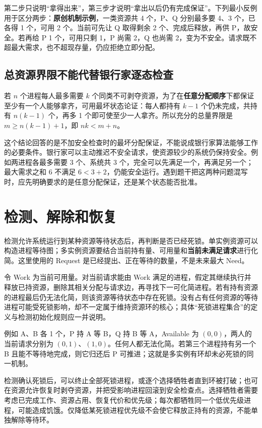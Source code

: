 第二步只说明``拿得出来''，第三步才说明``拿出以后仍有完成保证''。下列最小反例用于区分两步：\textbf{原创机制示例}，一类资源共 4 个，P、Q 分别最多要 4、3 个，已各得 1 个，可用 2 个。当前可先让 Q 取得剩余 2 个、完成后释放，再供 P，故安全。若再给 P 1 个，可用只剩 1，P 尚需 2，Q 也尚需 2，变为不安全。请求既不超最大需求，也不超现存量，仍应拒绝立即分配。

\subsection{总资源界限不能代替银行家逐态检查}\label{os-c04-h147}

若 \(n\) 个进程每人最多需要 \(k\) 个同类不可剥夺资源，为了在\textbf{任意分配顺序}下都保证至少有一个人能够拿齐，可用最坏状态论证：每人都持有 \(k-1\) 个仍未完成，共持有 \(n(k-1)\) 个，再多 1 个即可使至少一人拿齐。所以充分的总量界限是 \(m\ge n(k-1)+1\)，即 \(nk<m+n\)。

这个结论回答的是不加安全检查时的最坏分配保证，不能说成银行家算法能够工作的必要条件。银行家可以主动推迟不安全请求，使资源较少的系统仍保持安全。例如两进程各最多需要 3 个、系统共 3 个，完全可以先满足一个，再满足另一个；最大需求之和 6 不满足 \(6<3+2\)，仍能安全运行。遇到题干把这两种问题混写时，应先明确要求的是任意分配保证，还是某个状态能否批准。

\section{检测、解除和恢复}\label{os-4-4}

检测允许系统运行到某种资源等待状态后，再判断是否已经死锁。单实例资源可以构造进程等待图；多实例资源要结合当前持有量、可用量和\textbf{当前未满足请求}进行化简。这里使用的 Request 是已经提出、正在等待的数量，不是未来最大 Need。

令 Work 为当前可用量。对当前请求能由 Work 满足的进程，假定其继续执行并释放已持资源，删除其相关分配与请求边，再寻找下一可化简进程。若有持有资源的进程最后仍无法化简，则该资源等待状态中存在死锁。没有占有任何资源的等待进程可能受死锁影响，却不一定属于维持资源环的核心；具体``死锁进程集合''的定义与检测初始化规则应一并说明。

例如 A、B 各 1 个，P 持 A 等 B，Q 持 B 等 A，Available 为 \((0,0)\)，两人的当前请求分别为 \((0,1)\)、\((1,0)\)。任何人都无法化简。若第三个进程持有另一个 B 且能不等待地完成，则它归还后 P 可推进；这就是多实例有环却未必死锁的同一机制。

检测确认死锁后，可以终止全部死锁进程，或逐个选择牺牲者直到环被打破；也可在资源允许恢复时剥夺资源，并把受影响进程回滚到安全检查点。选择牺牲者需要考虑已完成工作、资源占用、恢复代价和优先级；每次都牺牲同一个低优先级进程，可能造成饥饿。仅降低某死锁进程优先级不会使它释放正持有的资源，不能单独解除等待环。

